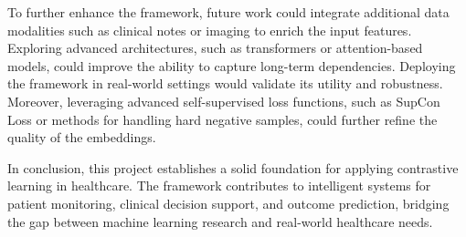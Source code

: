 \documentclass[twocolumn]{article}
\begin{document}
    To further enhance the framework, future work could integrate additional data
    modalities such as clinical notes or imaging to enrich the input features.
    Exploring advanced architectures, such as transformers or attention-based models,
    could improve the ability to capture long-term dependencies. Deploying the framework
    in real-world settings would validate its utility and robustness. Moreover, leveraging
    advanced self-supervised loss functions, such as SupCon Loss or methods for
    handling hard negative samples, could further refine the quality of the embeddings.

    In conclusion, this project establishes a solid foundation for applying
    contrastive learning in healthcare. The framework contributes to intelligent
    systems for patient monitoring, clinical decision support, and outcome prediction,
    bridging the gap between machine learning research and real-world healthcare
    needs.
\end{document}
